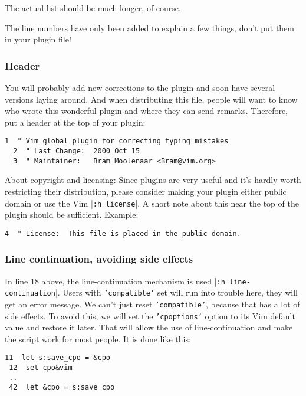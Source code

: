 The actual list should be much longer, of course.

The line numbers have only been added to explain a few things, don't put them in your plugin file!
\subsubsection{Header}
You will probably add new corrections to the plugin and soon have several versions laying around.
And when distributing this file, people will want to know who wrote this wonderful plugin and where they can send remarks.
Therefore, put a header at the top of your plugin:

\begin{Verbatim}[samepage=true]
  1  " Vim global plugin for correcting typing mistakes
  2  " Last Change:  2000 Oct 15
  3  " Maintainer:   Bram Moolenaar <Bram@vim.org>
\end{Verbatim}

About copyright and licensing: Since plugins are very useful and it's hardly worth restricting their distribution, please consider making your plugin either public domain or use the Vim |\verb!:h license!|.
A short note about this near the top of the plugin should be sufficient.
Example:

\begin{Verbatim}[samepage=true]
  4  " License:  This file is placed in the public domain.
\end{Verbatim}

\subsubsection{Line continuation, avoiding side effects}
\label{use-cpo-save}

In line 18 above, the line-continuation mechanism is used |\texttt{:h line-continuation}|.
Users with \texttt{'compatible'} set will run into trouble here, they will get an error message.
We can't just reset \texttt{'compatible'}, because that has a lot of side effects.
To avoid this, we will set the \texttt{'cpoptions'} option to its Vim default value and restore it later.
That will allow the use of line-continuation and make the script work for most people.
It is done like this:

\begin{Verbatim}[samepage=true]
 11  let s:save_cpo = &cpo
 12  set cpo&vim
 ..
 42  let &cpo = s:save_cpo
\end{Verbatim}

